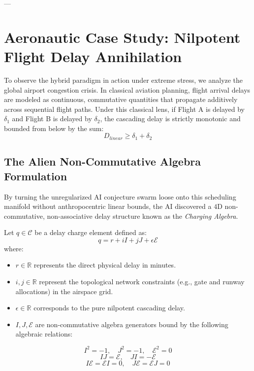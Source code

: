 \documentclass[11pt,a4paper]{book}
\begin{document}
---

\section{Aeronautic Case Study: Nilpotent Flight Delay Annihilation}
\label{sec:delay_annihilation}

To observe the hybrid paradigm in action under extreme stress, we analyze the global airport congestion crisis. In classical aviation planning, flight arrival delays are modeled as continuous, commutative quantities that propagate additively across sequential flight paths. Under this classical lens, if Flight A is delayed by $\delta_1$ and Flight B is delayed by $\delta_2$, the cascading delay is strictly monotonic and bounded from below by the sum:
\begin{equation}
    D_{linear} \geq \delta_1 + \delta_2
\end{equation}

\subsection{The Alien Non-Commutative Algebra Formulation}
By turning the unregularized AI conjecture swarm loose onto this scheduling manifold without anthropocentric linear bounds, the AI discovered a $4\text{D}$ non-commutative, non-associative delay structure known as the \textit{Charging Algebra}. 

Let $q \in \mathcal{C}$ be a delay charge element defined as:
\begin{equation}
    q = r + i I + j J + \epsilon \mathcal{E}
\end{equation}
where:
\begin{itemize}
    \item $r \in \mathbb{R}$ represents the direct physical delay in minutes.
    \item $i, j \in \mathbb{R}$ represent the topological network constraints (e.g., gate and runway allocations) in the airspace grid.
    \item $\epsilon \in \mathbb{R}$ corresponds to the pure nilpotent cascading delay.
    \item $I, J, \mathcal{E}$ are non-commutative algebra generators bound by the following algebraic relations:
\end{itemize}

\begin{equation}
    I^2 = -1, \quad J^2 = -1, \quad \mathcal{E}^2 = 0
\end{equation}
\begin{equation}
    I J = \mathcal{E}, \quad J I = -\mathcal{E}
\end{equation}
\begin{equation}
    I \mathcal{E} = \mathcal{E} I = 0, \quad J \mathcal{E} = \mathcal{E} J = 0
\end{equation}
\end{document}
